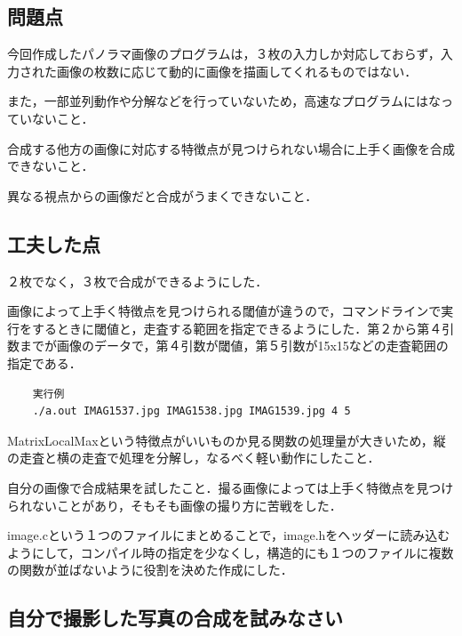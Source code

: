 \documentclass[11pt]{jarticle}
\begin{document}
\subsection{問題点}
今回作成したパノラマ画像のプログラムは，３枚の入力しか対応しておらず，入力された画像の枚数に応じて動的に画像を描画してくれるものではない．


また，一部並列動作や分解などを行っていないため，高速なプログラムにはなっていないこと．


合成する他方の画像に対応する特徴点が見つけられない場合に上手く画像を合成できないこと．

異なる視点からの画像だと合成がうまくできないこと．

\subsection{工夫した点}
２枚でなく，３枚で合成ができるようにした．


画像によって上手く特徴点を見つけられる閾値が違うので，コマンドラインで実行をするときに閾値と，走査する範囲を指定できるようにした．第２から第４引数までが画像のデータで，第４引数が閾値，第５引数が15x15などの走査範囲の指定である．
\begin{verbatim}
    実行例
    ./a.out IMAG1537.jpg IMAG1538.jpg IMAG1539.jpg 4 5
\end{verbatim}

MatrixLocalMaxという特徴点がいいものか見る関数の処理量が大きいため，縦の走査と横の走査で処理を分解し，なるべく軽い動作にしたこと．

自分の画像で合成結果を試したこと．撮る画像によっては上手く特徴点を見つけられないことがあり，そもそも画像の撮り方に苦戦をした．

image.cという１つのファイルにまとめることで，image.hをヘッダーに読み込むようにして，コンパイル時の指定を少なくし，構造的にも１つのファイルに複数の関数が並ばないように役割を決めた作成にした．

\subsection{自分で撮影した写真の合成を試みなさい}
\end{document}
